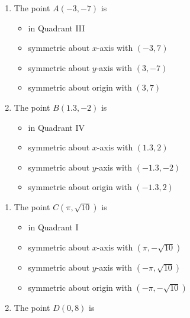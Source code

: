 \documentclass{ximera}
\begin{document}
\begin{enumerate}
\begin{multicols}{2}
\begin{enumerate}

\item The point $A(-3, -7)$ is 

\begin{itemize}

\item in Quadrant III
\item symmetric about $x$-axis with $(-3, 7)$
\item symmetric about $y$-axis with $(3, -7)$
\item symmetric about origin with $(3, 7)$

\end{itemize}

\item The point $B(1.3, -2)$ is 

\begin{itemize}

\item in Quadrant IV
\item symmetric about $x$-axis with $(1.3, 2)$
\item symmetric about $y$-axis with $(-1.3, -2)$
\item symmetric about origin with $(-1.3, 2)$

\end{itemize}

\setcounter{HWindent}{\value{enumii}}
\end{enumerate}
\end{multicols}

\begin{multicols}{2}
\begin{enumerate}
\setcounter{enumii}{\value{HWindent}}

\item The point $C(\pi, \sqrt{10})$ is 

\begin{itemize}

\item in Quadrant I
\item symmetric about $x$-axis with {\small $(\pi, -\sqrt{10})$}
\item symmetric about $y$-axis with {\small $(-\pi, \sqrt{10})$}
\item symmetric about origin with {\scriptsize $(-\pi, -\sqrt{10})$}

\end{itemize}

\item The point $D(0, 8)$ is 


\end{enumerate}
\end{multicols}
\end{enumerate}
\end{document}
